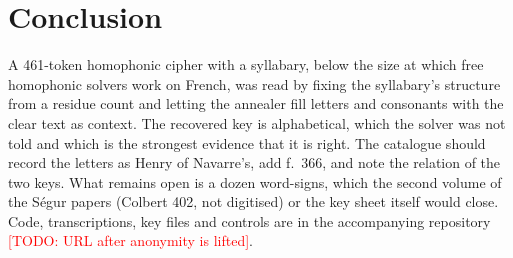 \documentclass[11pt]{article}
\newcommand{\todo}[1]{\textcolor{red}{[TODO: #1]}}
\begin{document}
\section{Conclusion}

A 461-token homophonic cipher with a syllabary, below the size at which free homophonic solvers work on French, was read by fixing the syllabary's structure from a residue count and letting the annealer fill letters and consonants with the clear text as context. The recovered key is alphabetical, which the solver was not told and which is the strongest evidence that it is right. The catalogue should record the letters as Henry of Navarre's, add f.~366, and note the relation of the two keys. What remains open is a dozen word-signs, which the second volume of the S\'egur papers (Colbert 402, not digitised) or the key sheet itself would close. Code, transcriptions, key files and controls are in the accompanying repository \todo{URL after anonymity is lifted}.



\end{document}
